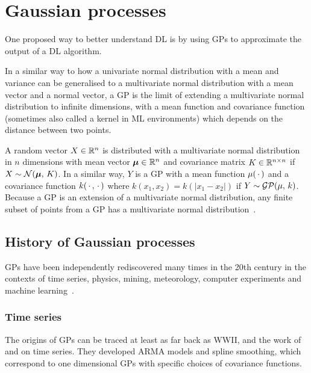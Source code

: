 
\section{Gaussian processes}

One proposed way to better understand \ac{DL} is by using \acp{GP} to approximate the output of a \ac{DL} algorithm.

In a similar way to how a univariate normal distribution with a mean and variance can be generalised to a multivariate normal distribution with a mean vector and a normal vector, a \ac{GP} is the limit of extending a multivariate normal distribution to infinite dimensions, with a mean function and covariance function (sometimes also called a kernel in ML environments) which depends on the distance between two points.

A random vector \(X \in \mathbb{R}{}^n\) is distributed with a multivariate normal distribution in \(n\) dimensions with mean vector \(\bm{\mu} \in \mathbb{R}{}^n\) and covariance matrix \(K \in \mathbb{R}^{n \times n}\) if \(X \sim \mathcal{N}(\bm{\mu},\, K)\).
In a similar way, \(Y\) is a \ac{GP} with a mean function \(\mu(\,\cdot\,)\) and a covariance function \(k(\,\cdot\,{}, \,\cdot\,{})\) where \(k(x_1, x_2) = k(\left|x_1-x_2\right|)\) if \(Y \sim \mathcal{GP}(\mu,\, k)\).
Because a \ac{GP} is an extension of a multivariate normal distribution, any finite subset of points from a \ac{GP} has a multivariate normal distribution~\autocite[515]{williams1996}.

\subsection{History of Gaussian processes}

\acp{GP} have been independently rediscovered many times in the 20th century in the contexts of time series, physics, mining, meteorology, computer experiments and machine learning~\autocite[2]{mackay1997}.

\subsubsection{Time series}

The origins of \acp{GP} can be traced at least as far back as WWII, and the work of \textcite{wold1938} and \textcite{wiener1949} on time series.
They developed ARMA models and spline smoothing, which correspond to one dimensional \acp{GP} with specific choices of covariance functions.

